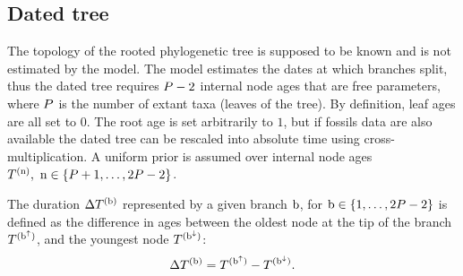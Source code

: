 \documentclass{article}
\begin{document}
\subsection{Dated tree}
The topology of the rooted phylogenetic tree is supposed to be known and is not estimated by the model.
The model estimates the dates at which branches split, thus the dated tree requires $P - 2$ internal node ages that are free parameters, where $P$ is the number of extant taxa (leaves of the tree).
By definition, leaf ages are all set to $0$.
The root age is set arbitrarily to $1$, but if fossils data are also available the dated tree can be rescaled into absolute time using cross-multiplication.
A uniform prior is assumed over internal node ages $T^{(\text{n})},\ \text{n} \in \{P + 1, \hdots, 2 P - 2\}$.

The duration $\Delta T^{(\text{b})}$ represented by a given branch $\text{b}$, for $\text{b} \in \{1, \hdots, 2 P - 2\}$ is defined as the difference in ages between the oldest node at the tip of the branch $T^{(\text{b}^{\uparrow})}$, and the youngest node $T^{(\text{b}^{\downarrow})}$:
\begin{equation}
    \label{eq:ageTobranchtime}
    \Delta T^{(\text{b})} = T^{(\text{b}^{\uparrow})} - T^{(\text{b}^{\downarrow})}.
\end{equation}
\end{document}
